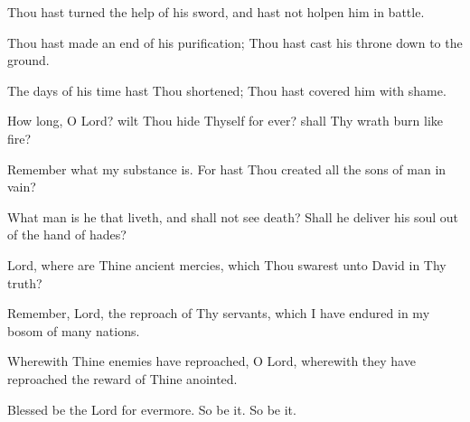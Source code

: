 Thou hast turned the help of his sword, and hast not holpen him in battle.

Thou hast made an end of his purification; Thou hast cast his throne down to the ground.

The days of his time hast Thou shortened;  Thou hast covered him with shame.

How long, O Lord? wilt Thou hide Thyself for ever? shall Thy wrath burn like fire?

Remember what my substance is. For hast Thou created all the sons of man in vain?

What man is he that liveth, and shall not see death? Shall he deliver his soul out of the hand of hades?

Lord, where are Thine ancient mercies, which Thou swarest unto David in Thy truth?

Remember, Lord, the reproach of Thy servants, which I have endured in my bosom of many nations.

Wherewith Thine enemies have reproached, O Lord, wherewith they have reproached the reward of Thine anointed.

Blessed be the Lord for evermore. So be it. So be it.
